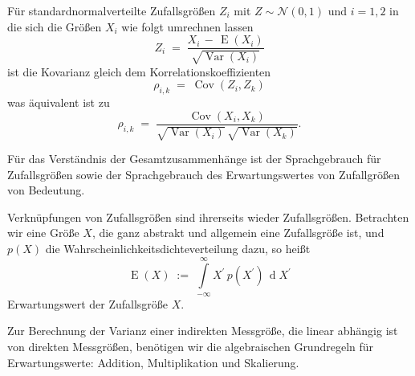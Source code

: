Für standardnormalverteilte Zufallsgrößen $Z_i$ mit $Z \sim \mathcal{N}(0,1)$
und $i = 1,2$ in die sich
die Größen $X_i$ wie folgt umrechnen lassen
\begin{equation}
Z_i \; = \; \frac{X_i \, - \, \operatorname{E}(X_i)}{\sqrt{\operatorname {Var}(X_{i})}}
\end{equation}
ist die Kovarianz gleich dem Korrelationskoeffizienten
\begin{equation}
\rho_{i,k} \; = \; \operatorname {Cov}(Z_{i},Z_{k})
\end{equation}
was äquivalent ist zu
\begin{equation}
\rho_{i,k} \; = \; \frac{\operatorname {Cov}(X_{i},X_{k})}{\sqrt{\operatorname {Var}(X_{i})} \, \sqrt{\operatorname {Var}(X_{k})}} .
\label{KorrelationskoeffizientKap1}
\end{equation}


Für das Verständnis der Gesamtzusammenhänge ist der Sprachgebrauch für Zufallsgrößen sowie
der Sprachgebrauch des Erwartungswertes von Zufallgrößen von Bedeutung.

Verknüpfungen von Zufallsgrößen sind ihrerseits wieder Zufallsgrößen. Betrachten
wir eine Größe $X$, die ganz abstrakt und allgemein eine Zufallsgröße ist, und
$p(X)$ die Wahrscheinlichkeitsdichteverteilung dazu, so heißt
\begin{equation}
\operatorname{E}(X) \; := \;  \int\limits_{-\infty}^{\infty}
X^\prime \, p(X^\prime) \, \operatorname{d} X^\prime
\end{equation}
Erwartungswert der Zufallsgröße $X$.

Zur Berechnung der Varianz einer indirekten Messgröße, die linear abhängig ist
von direkten Messgrößen, benötigen wir die algebraischen Grundregeln für
Erwartungswerte: Addition, Multiplikation und Skalierung.

